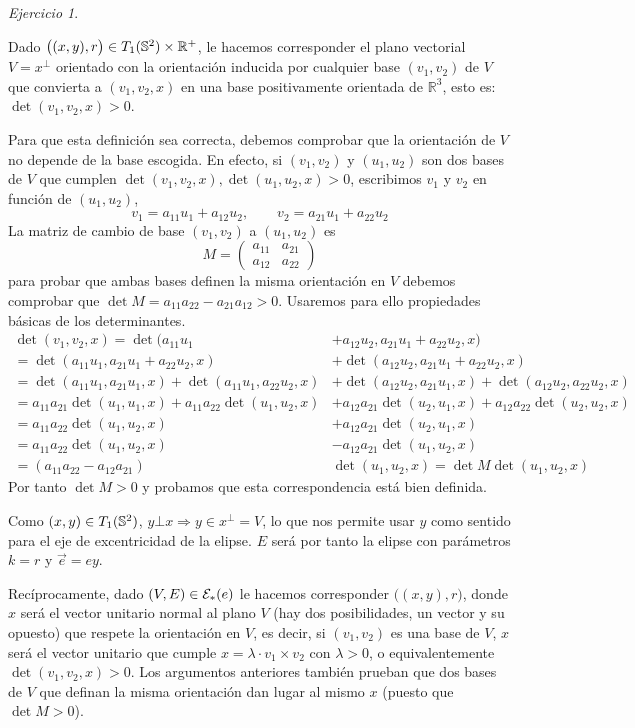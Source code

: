 \documentclass[12pt,spanish]{article}
\theoremstyle{definition}
\theoremstyle{remark}
\newtheorem{exercise}{Ejercicio}
\newcommand{\R}{\mathbb{R}}
\begin{document}
\begin{exercise}
\begin{enumerate}[a)]
    Dado $\big((x,y),r\big)\in\T\times\R^+$, le hacemos corresponder
    el plano vectorial $V=x^\bot$ orientado con la orientación
    inducida por cualquier base $(v_1,v_2)$ de $V$ que convierta a
    $(v_1,v_2,x)$ en una base positivamente orientada de $\R^3$, esto
    es: $\det(v_1,v_2,x)>0$.

    Para que esta definición sea correcta, debemos comprobar que la
    orientación de $V$ no depende de la base escogida. En efecto, si
    $(v_1,v_2)$ y $(u_1,u_2)$ son dos bases de $V$ que cumplen
    $\det(v_1,v_2,x), \det(u_1,u_2,x)>0$, escribimos $v_1$ y $v_2$ en
    función de $(u_1,u_2)$,
    \[v_1=a_{11}u_1+a_{12}u_2,\qquad v_2=a_{21}u_1+a_{22}u_2\] La
    matriz de cambio de base $(v_1,v_2)$ a $(u_1,u_2)$ es
    \[M=\begin{pmatrix}
        a_{11} & a_{21} \\
        a_{12} & a_{22}
      \end{pmatrix}\] para probar que ambas bases definen la misma
    orientación en $V$ debemos comprobar que
    $\det M=a_{11}a_{22}-a_{21}a_{12}>0$. Usaremos para ello
    propiedades básicas de los determinantes.
    \begin{align*}
      \det(v_1,v_2,x)=\det(a_{11}u_1&+a_{12}u_2,a_{21}u_1+a_{22}u_2,x) \\
       =\det(a_{11}u_1,a_{21}u_1+a_{22}u_2,x)&+\det(a_{12}u_2,a_{21}u_1+a_{22}u_2,x) \\
      =\det(a_{11}u_1,a_{21}u_1,x)+\det(a_{11}u_1,a_{22}u_2,x)&+\det(a_{12}u_2,a_{21}u_1,x)+\det(a_{12}u_2,a_{22}u_2,x) \\
      =a_{11}a_{21}\det(u_1,u_1,x)+a_{11}a_{22}\det(u_1,u_2,x)&+a_{12}a_{21}\det(u_2,u_1,x)+a_{12}a_{22}\det(u_2,u_2,x) \\
      =a_{11}a_{22}\det(u_1,u_2,x)&+a_{12}a_{21}\det(u_2,u_1,x) \\
      =a_{11}a_{22}\det(u_1,u_2,x)&-a_{12}a_{21}\det(u_1,u_2,x) \\
      =(a_{11}a_{22}-a_{12}a_{21})&\det(u_1,u_2,x) = \det M \det(u_1,u_2,x)
    \end{align*}
    Por tanto $\det M>0$ y probamos que esta correspondencia está bien
    definida.

    Como $(x,y)\in T_1(\mathbb{S}^2)$, $y\bot x\Rightarrow y\in x^\bot = V$, lo que
    nos permite usar $y$ como sentido para el eje de excentricidad de
    la elipse. $E$ será por tanto la elipse con parámetros $k=r$ y
    $\vec{e}=ey$.

    Recíprocamente, dado $(V,E)\in \mathcal{E}_*(e)$ le hacemos corresponder
    $\big((x,y),r\big)$, donde $x$ será el vector unitario normal al
    plano $V$ (hay dos posibilidades, un vector y su opuesto) que
    respete la orientación en $V$, es decir, si $(v_1,v_2)$ es una
    base de $V$, $x$ será el vector unitario que cumple
    $x=\lambda\cdot v_1\times v_2$ con $\lambda >0$, o
    equivalentemente $\det(v_1,v_2,x)>0$. Los argumentos anteriores
    también prueban que dos bases de $V$ que definan la misma
    orientación dan lugar al mismo $x$ (puesto que $\det M>0$).


\end{enumerate}
\end{exercise}
\end{document}
